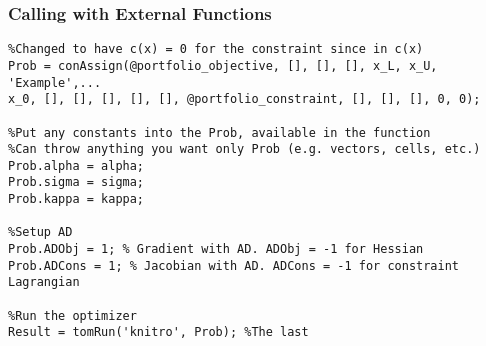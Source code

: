 \documentclass[nofootline]{etk-presentation}
\begin{document}
\begin{frame}[fragile]	\frametitle{Calling with External Functions}
\begin{verbatim}
%Changed to have c(x) = 0 for the constraint since in c(x)
Prob = conAssign(@portfolio_objective, [], [], [], x_L, x_U, 'Example',...
x_0, [], [], [], [], [], @portfolio_constraint, [], [], [], 0, 0);

%Put any constants into the Prob, available in the function
%Can throw anything you want only Prob (e.g. vectors, cells, etc.)
Prob.alpha = alpha;
Prob.sigma = sigma;
Prob.kappa = kappa;

%Setup AD
Prob.ADObj = 1; % Gradient with AD. ADObj = -1 for Hessian
Prob.ADCons = 1; % Jacobian with AD. ADCons = -1 for constraint Lagrangian 

%Run the optimizer
Result = tomRun('knitro', Prob); %The last 	
\end{verbatim}	
\end{frame}	
%
%
%
\end{document}
